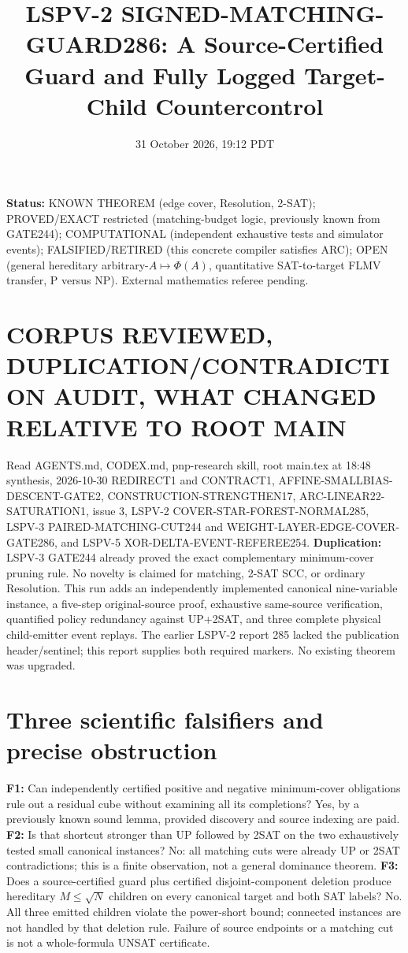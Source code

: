 \documentclass[10pt]{article}
\title{LSPV-2 SIGNED-MATCHING-GUARD286: A Source-Certified Guard and Fully Logged Target-Child Countercontrol}
\date{31 October 2026, 19:12 PDT}
\begin{document}
\maketitle
\noindent\textbf{Status:} KNOWN THEOREM (edge cover, Resolution, 2-SAT);
PROVED/EXACT restricted (matching-budget logic, previously known from GATE244);
COMPUTATIONAL (independent exhaustive tests and simulator events);
FALSIFIED/RETIRED (this concrete compiler satisfies ARC);
OPEN (general hereditary arbitrary-$A\mapsto\Phi(A)$, quantitative SAT-to-target FLMV transfer, P versus NP).
External mathematics referee pending.

\section*{CORPUS REVIEWED, DUPLICATION/CONTRADICTION AUDIT, WHAT CHANGED RELATIVE TO ROOT MAIN}
Read AGENTS.md, CODEX.md, pnp-research skill, root main.tex at 18:48 synthesis,
2026-10-30 REDIRECT1 and CONTRACT1, AFFINE-SMALLBIAS-DESCENT-GATE2,
CONSTRUCTION-STRENGTHEN17, ARC-LINEAR22-SATURATION1, issue 3,
LSPV-2 COVER-STAR-FOREST-NORMAL285, LSPV-3 PAIRED-MATCHING-CUT244
and WEIGHT-LAYER-EDGE-COVER-GATE286, and LSPV-5 XOR-DELTA-EVENT-REFEREE254.
\textbf{Duplication:} LSPV-3 GATE244 already proved the exact complementary
minimum-cover pruning rule. No novelty is claimed for matching, 2-SAT SCC,
or ordinary Resolution. This run adds an independently implemented canonical
nine-variable instance, a five-step original-source proof, exhaustive
same-source verification, quantified policy redundancy against UP+2SAT,
and three complete physical child-emitter event replays.
The earlier LSPV-2 report 285 lacked the publication header/sentinel;
this report supplies both required markers. No existing theorem was upgraded.

\section*{Three scientific falsifiers and precise obstruction}
\noindent\textbf{F1:} Can independently certified positive and negative
minimum-cover obligations rule out a residual cube without examining all its
completions? Yes, by a previously known sound lemma, provided discovery
and source indexing are paid.
\textbf{F2:} Is that shortcut stronger than UP followed by 2SAT on the
two exhaustively tested small canonical instances? No: all matching cuts
were already UP or 2SAT contradictions; this is a finite observation,
not a general dominance theorem.
\textbf{F3:} Does a source-certified guard plus certified disjoint-component
deletion produce hereditary $M\le\sqrt N$ children on every canonical target
and both SAT labels? No. All three emitted children violate the power-short
bound; connected instances are not handled by that deletion rule.
Failure of source endpoints or a matching cut is not a whole-formula
UNSAT certificate.
\end{document}
